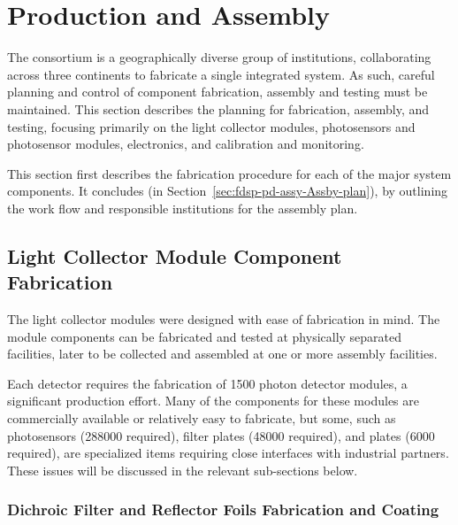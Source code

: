 \section{Production and Assembly}
\label{sec:fdsp-pd-prod-assy}

The \single {} consortium is a geographically diverse group of institutions, collaborating across three continents to fabricate a single integrated system.  As such, careful planning and control of component fabrication, assembly and testing must be maintained.
This section describes the planning for fabrication, assembly, and testing, focusing primarily on the  light collector modules, photosensors and photosensor modules, electronics, and calibration and monitoring.
 
This section first describes the fabrication procedure for each of the major  system components.  It concludes (in Section~\ref{sec:fdsp-pd-assy-Assby-plan}), by outlining the work flow and responsible institutions for the assembly plan.

\subsection{Light Collector Module Component Fabrication}

The  light collector modules were designed with ease of fabrication in mind.  The module components can be fabricated and  tested at physically separated facilities, later to be collected and assembled at one or more assembly facilities. 

Each  detector requires the fabrication of \num{1500} photon detector modules, a significant production effort.  Many of the components for these modules are commercially available or relatively easy to fabricate, but some, such as photosensors (\num{288000} required), filter plates (\num{48000} required), and  plates (\num{6000} required), are specialized items requiring close interfaces with industrial partners.  These issues will be discussed in the relevant sub-sections below.   

\subsubsection{Dichroic Filter and Reflector Foils Fabrication and Coating}

